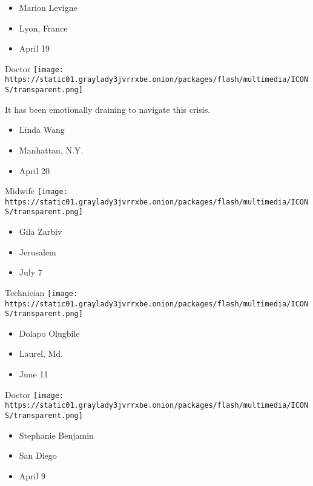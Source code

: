 \begin{itemize}
\tightlist
\item
  Marion Levigne
\item
  Lyon, France
\item
  April 19
\end{itemize}

\protect\hyperlink{item-linda-wang}{}

Doctor
\texttt{[image: https://static01.graylady3jvrrxbe.onion/packages/flash/multimedia/ICONS/transparent.png]}

It has been emotionally draining to navigate this crisis.

\begin{itemize}
\tightlist
\item
  Linda Wang
\item
  Manhattan, N.Y.
\item
  April 20
\end{itemize}

\protect\hyperlink{item-gila-zarbiv}{}

Midwife
\texttt{[image: https://static01.graylady3jvrrxbe.onion/packages/flash/multimedia/ICONS/transparent.png]}

\begin{itemize}
\tightlist
\item
  Gila Zarbiv
\item
  Jerusalem
\item
  July 7
\end{itemize}

\protect\hyperlink{item-dolapo-olugbile}{}

Technician
\texttt{[image: https://static01.graylady3jvrrxbe.onion/packages/flash/multimedia/ICONS/transparent.png]}

\begin{itemize}
\tightlist
\item
  Dolapo Olugbile
\item
  Laurel, Md.
\item
  June 11
\end{itemize}

\protect\hyperlink{item-stephanie-benjamin}{}

Doctor
\texttt{[image: https://static01.graylady3jvrrxbe.onion/packages/flash/multimedia/ICONS/transparent.png]}

\begin{itemize}
\tightlist
\item
  Stephanie Benjamin
\item
  San Diego
\item
  April 9
\end{itemize}

